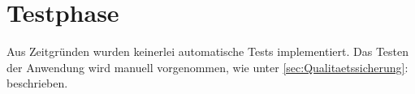 \section{Testphase} 
\label{sec:Testphase}
Aus Zeitgründen wurden keinerlei automatische Tests implementiert. Das Testen
der Anwendung wird manuell vorgenommen, wie unter
\ref{sec:Qualitaetssicherung}:  beschrieben.
